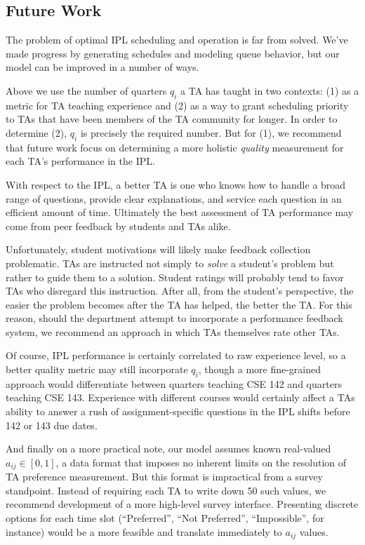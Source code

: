 \documentclass{article}
\begin{document}
\begin{multicols}{2}
\section*{Future Work}

The problem of optimal IPL scheduling and operation is far from solved. We've made progress by generating schedules and modeling queue behavior, but our model can be improved in a number of ways.

Above we use the number of quarters $q_i$ a TA has taught in two contexts: (1) as a metric for TA teaching experience and (2) as a way to grant scheduling priority to TAs that have been members of the TA community for longer. In order to determine (2), $q_i$ is precisely the required number. But for (1), we recommend that future work focus on determining a more holistic \textit{quality} measurement for each TA's performance in the IPL.

With respect to the IPL, a better TA is one who knows how to handle a broad range of questions, provide clear explanations, and service each question in an efficient amount of time. Ultimately the best assessment of TA performance may come from peer feedback by students and TAs alike.

Unfortunately, student motivations will likely make feedback collection problematic. TAs are instructed not simply to \textit{solve} a student's problem but rather to guide them to a solution. Student ratings will probably tend to favor TAs who disregard this instruction. After all, from the student's perspective, the easier the problem becomes after the TA has helped, the better the TA. For this reason, should the department attempt to incorporate a performance feedback system, we recommend an approach in which TAs themselves rate other TAs.

Of course, IPL performance is certainly correlated to raw experience level, so a better quality metric may still incorporate $q_i$, though a more fine-grained approach would differentiate between quarters teaching CSE 142 and quarters teaching CSE 143. Experience with different courses would certainly affect a TAs ability to answer a rush of assignment-specific questions in the IPL shifts before 142 or 143 due dates.

And finally on a more practical note, our model assumes known real-valued $a_{ij} \in [0,1]$, a data format that imposes no inherent limits on the resolution of TA preference measurement. But this format is impractical from a survey standpoint. Instead of requiring each TA to write down 50 such values, we recommend development of a more high-level survey interface. Presenting discrete options for each time slot (``Preferred'', ``Not Preferred'', ``Impossible'', for instance) would be a more feasible and translate immediately to $a_{ij}$ values.


\end{multicols}
\end{document}
